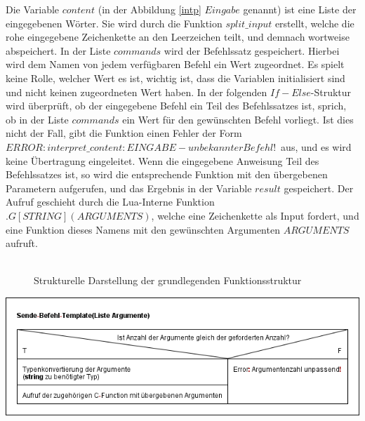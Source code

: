 Die Variable $content$ (in der Abbildung \ref{intp} $Eingabe$ genannt) ist eine Liste der eingegebenen Wörter. Sie wird durch die Funktion $split\_input$ erstellt, welche die rohe eingegebene Zeichenkette an den Leerzeichen teilt, und demnach wortweise abspeichert. In der Liste $commands$ wird der Befehlssatz gespeichert. 
Hierbei wird dem Namen von jedem verfügbaren Befehl ein Wert zugeordnet. Es spielt keine Rolle, welcher Wert es ist, wichtig ist, dass die Variablen initialisiert sind und nicht keinen zugeordneten Wert haben. 
In der folgenden $If-Else$-Struktur wird überprüft, ob der eingegebene Befehl ein Teil des Befehlssatzes ist, sprich, ob in der Liste $commands$ ein Wert für den gewünschten Befehl vorliegt. 
Ist dies nicht der Fall, gibt die Funktion einen Fehler der Form \glqq$ERROR: interpret\_content: EINGABE - unbekannter Befehl!$\grqq\ aus, und es wird keine Übertragung eingeleitet. 
Wenn die eingegebene Anweisung Teil des Befehlssatzes ist, so wird die entsprechende Funktion mit den übergebenen Parametern aufgerufen, und das Ergebnis in der Variable $result$ gespeichert. 
Der Aufruf geschieht durch die Lua-Interne Funktion $.G[STRING](ARGUMENTS)$, welche eine Zeichenkette als Input fordert, und eine Funktion dieses Namens mit den gewünschten Argumenten $ARGUMENTS$ aufruft.\\\\

\begin{figure}[h!]
\label{fkts}
\caption{Strukturelle Darstellung der grundlegenden Funktionsstruktur}
\end{figure}
\includegraphics[scale=0.75]{inp}\\

